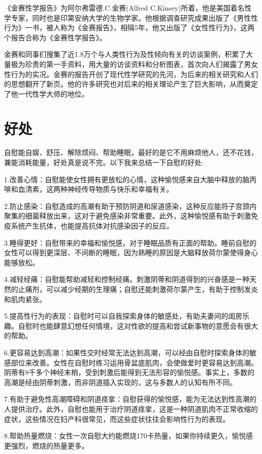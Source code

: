 \documentclass[12pt,UTF8]{ctexbook}
\begin{document}
《金赛性学报告》为阿尔弗雷德.C.金赛(Alfred C.Kinsey)所着，他是美国着名性学专家，同时也是印第安纳大学的生物学家。他根据调查研究成果出版了《男性性行为》一书，被人称为《金赛报告》，相隔5年，他又出版了《女性性行为》，这两个报告合称为《金赛性学报告》。

金赛和同事们搜集了近1.8万个与人类性行为及性倾向有关的访谈案例，积累了大量极为珍贵的第一手资料，用大量的访谈资料和分析图表，首次向人们揭露了男女性行为的实况。金赛的报告开创了现代性学研究的先河，为后来的相关研究和人们的思想翻开了新页。他的许多研究也对后来的相关理论产生了巨大影响，从而奠定了他一代性学大师的地位。

\section{好处}

自慰能自娱、舒压、解除烦闷、帮助睡眠，最好的是它不用麻烦他人，还不花钱，兼能消耗能量，好处真是说不完。以下我来总结一下自慰的好处:

1.改善心情：自慰能使女性拥有更放松的心情，这种愉悦感来自大脑中释放的脑丙啡和血清素，这两种神经传导物质与快乐和幸福有关。

2.防止感染：自慰造成的高潮有助于预防阴道和尿道感染，这种反应能将子宫颈内聚集的细菌释放出来，这对于避免感染非常重要。此外，这种愉悦感有助于刺激免疫系统产生抗体，也能提高抗体对抗感染因子的反应。

3.睡得更好：自慰带来的幸福和愉悦感，对于睡眠品质有正面的帮助。睡前自慰的女性可以得到更深层、不间断的睡眠，因为熟睡的原因是大脑释放荷尔蒙使得身心能够放松。

4.减轻经痛：自慰能帮助减轻和控制经痛。刺激阴蒂和阴道得到的兴奋感是一种天然的止痛剂，可以减少经期的生理痛；自慰还能刺激荷尔蒙产生，有助于控制发炎和肌肉紧张。

5.提高性行为的表现：自慰时可以自我探索身体的敏感处，有助夫妻间的闺房乐趣。自慰时也能肆意幻想任何情境，这对性欲的提高和尝试新事物的意愿会有很大的帮助。

6.更容易达到高潮：如果性交时经常无法达到高潮，可以经由自慰时探索身体的敏感部位来改善。女性在自慰时练习运用骨盆底肌肉，会使做爱时更容易达到高潮。阴蒂有8千多个神经末梢，受到刺激后能得到无法形容的愉悦感。事实上，多数的高潮是经由阴蒂刺激，而非阴道插入实现的，这与多数人的认知有所不同。

7.有助于避免性高潮障碍和阴道痉挛：自慰获得的愉悦感，能为无法达到性高潮的人提供治疗。此外，自慰也能用于治疗阴道痉挛，这是一种阴道肌肉不正常收缩的症状，这些情况在妇产科很常见，而这些症状往往会影响性行为的表现。

8.帮助热量燃烧：女性一次自慰大约能燃烧170卡热量，如果你持续更久，愉悦感更强烈，燃烧的热量更多。
\end{document}
